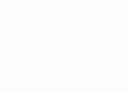 \documentclass{book}
\begin{document}

\thispagestyle{empty}



\cleardoublepage
{}
\begin{titlepage}
\pagecolor{blue}
\begin{center}
{
   \large
   \vspace*{2cm}
   { \Huge\textcolor{white}{\bf{Kolibri Manual}} }\\
   \vspace{\fill}
   {
      \doublespacing
      \textcolor{white}
      {
         Nils Eilers \\
         Christian Forstreuter \\
         Edilbert Kirk \\
         Thomas Winkler \\
      }
   }
}
\end{center}
\end{titlepage}
\pagecolor{white}





\end{document}
